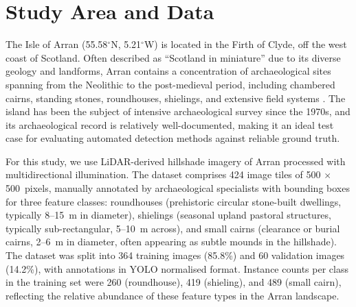 \documentclass[12pt,a4paper]{article}
\begin{document}
\section{Study Area and Data}

The Isle of Arran (55.58$^{\circ}$N, 5.21$^{\circ}$W) is located in the Firth of Clyde,
off the west coast of Scotland. Often described as ``Scotland in miniature'' due to its
diverse geology and landforms, Arran contains a concentration of archaeological sites
spanning from the Neolithic to the post-medieval period, including chambered cairns,
standing stones, roundhouses, shielings, and extensive field systems \citep{barber1997arran}.
The island has been the subject of intensive archaeological survey since the 1970s, and its
archaeological record is relatively well-documented, making it an ideal test case for
evaluating automated detection methods against reliable ground truth.

For this study, we use LiDAR-derived hillshade imagery of Arran processed with
multidirectional illumination. The dataset comprises 424 image tiles of 500 $\times$
500~pixels, manually annotated by archaeological specialists with bounding boxes for three
feature classes: roundhouses (prehistoric circular stone-built dwellings, typically 8--15~m
in diameter), shielings (seasonal upland pastoral structures, typically sub-rectangular,
5--10~m across), and small cairns (clearance or burial cairns, 2--6~m in diameter, often
appearing as subtle mounds in the hillshade). The dataset was split into 364 training
images (85.8\%) and 60 validation images (14.2\%), with annotations in YOLO normalised
format. Instance counts per class in the training set were 260 (roundhouse), 419 (shieling),
and 489 (small cairn), reflecting the relative abundance of these feature types in the
Arran landscape.



\end{document}
